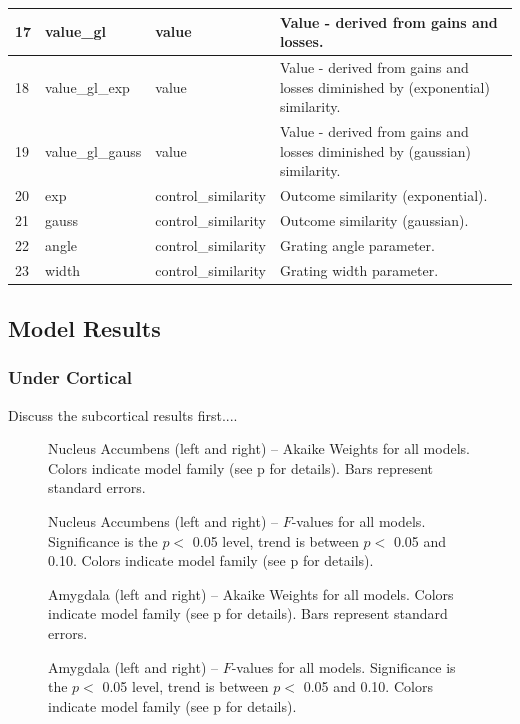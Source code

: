 \documentclass[doc,12pt]{apa}        %
\begin{document}
\begin{center}
\begin{longtable}{ | l | l | l | p{6cm} |}
        17 & value\_gl & value & Value - derived from gains and losses. \\ \hline
        18 & value\_gl\_exp & value & Value - derived from gains and losses diminished by (exponential) similarity. \\ \hline
        19 & value\_gl\_gauss & value & Value - derived from gains and losses diminished by (gaussian) similarity. \\ \hline 
        20 & exp & control\_similarity & Outcome similarity (exponential). \\ \hline
        21 & gauss & control\_similarity & Outcome similarity (gaussian). \\ \hline
        22 & angle & control\_similarity & Grating angle parameter. \\ \hline
        23 &width & control\_similarity & Grating width parameter. \\ \hline
    \end{longtable}
\end{center}


\subsection{Model Results}
\label{sub:modelresults}
\subsubsection{Under Cortical}
\label{subsub:belowctx}
Discuss the subcortical results first....

\begin{figure}[tp]
    \centering
    \caption{Nucleus Accumbens (left and right) -- Akaike Weights for all models.  Colors indicate model family (see p\pageref{sub:cmb} for details). Bars represent standard errors.}
	\label{fig:accumbens}
\end{figure}
\begin{figure}[tp]
    \centering
    \caption{Nucleus Accumbens (left and right) -- $F$-values for all models.  Significance is the $p <$ 0.05 level, trend is between $p <$ 0.05 and 0.10.  Colors indicate model family (see p\pageref{sub:cmb} for details).}
	\label{fig:fvalaccumbens}
\end{figure}


\begin{figure}[tp]
    \centering
    \caption{Amygdala (left and right) -- Akaike Weights for all models.  Colors indicate model family (see p\pageref{sub:cmb} for details). Bars represent standard errors.}
	\label{fig:amygdala}
\end{figure}
\begin{figure}[tp]
    \centering
    \caption{Amygdala (left and right) -- $F$-values for all models.  Significance is the $p <$ 0.05 level, trend is between $p <$ 0.05 and 0.10.  Colors indicate model family (see p\pageref{sub:cmb} for details).}
	\label{fig:fvalamygdala}
\end{figure}
\end{document}
